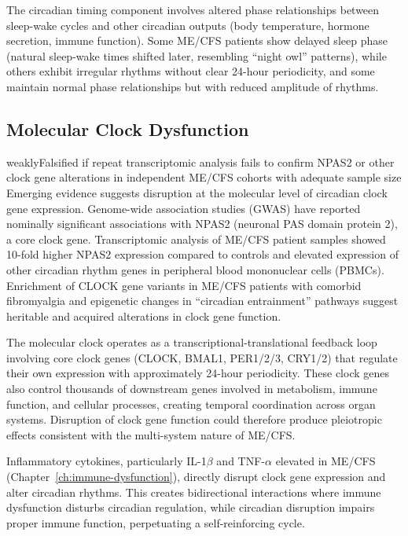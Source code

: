 The circadian timing component involves altered phase relationships between sleep-wake cycles and other circadian outputs (body temperature, hormone secretion, immune function). Some ME/CFS patients show delayed sleep phase (natural sleep-wake times shifted later, resembling ``night owl'' patterns), while others exhibit irregular rhythms without clear 24-hour periodicity, and some maintain normal phase relationships but with reduced amplitude of rhythms.

\subsection{Molecular Clock Dysfunction}

\begin{fhypothesis}{weakly}{Falsified if repeat transcriptomic analysis fails to confirm NPAS2 or other clock gene alterations in independent ME/CFS cohorts with adequate sample size}
\label{hyp:clock-genes}
Emerging evidence suggests disruption at the molecular level of circadian clock gene expression. Genome-wide association studies (GWAS) have reported nominally significant associations with NPAS2 (neuronal PAS domain protein 2), a core clock gene. Transcriptomic analysis of ME/CFS patient samples showed 10-fold higher NPAS2 expression compared to controls and elevated expression of other circadian rhythm genes in peripheral blood mononuclear cells (PBMCs). Enrichment of CLOCK gene variants in ME/CFS patients with comorbid fibromyalgia and epigenetic changes in ``circadian entrainment'' pathways suggest heritable and acquired alterations in clock gene function.
\end{fhypothesis}

The molecular clock operates as a transcriptional-translational feedback loop involving core clock genes (CLOCK, BMAL1, PER1/2/3, CRY1/2) that regulate their own expression with approximately 24-hour periodicity. These clock genes also control thousands of downstream genes involved in metabolism, immune function, and cellular processes, creating temporal coordination across organ systems. Disruption of clock gene function could therefore produce pleiotropic effects consistent with the multi-system nature of ME/CFS.

Inflammatory cytokines, particularly IL-1$\beta$ and TNF-$\alpha$ elevated in ME/CFS (Chapter~\ref{ch:immune-dysfunction}), directly disrupt clock gene expression and alter circadian rhythms. This creates bidirectional interactions where immune dysfunction disturbs circadian regulation, while circadian disruption impairs proper immune function, perpetuating a self-reinforcing cycle.


